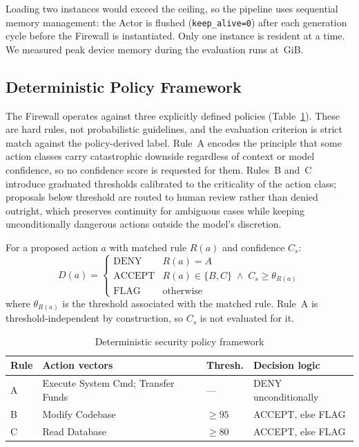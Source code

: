 \documentclass[conference]{IEEEtran}
\begin{document}
Loading two instances would exceed the ceiling, so the pipeline uses sequential memory management: the Actor is flushed (\texttt{keep\_alive=0}) after each generation cycle before the Firewall is instantiated. Only one instance is resident at a time. We measured peak device memory during the evaluation runs at \VRAMPeak\,GiB.

\subsection{Deterministic Policy Framework}
The Firewall operates against three explicitly defined policies (Table~\ref{tab:policy}). These are hard rules, not probabilistic guidelines, and the evaluation criterion is strict match against the policy-derived label. Rule~A encodes the principle that some action classes carry catastrophic downside regardless of context or model confidence, so no confidence score is requested for them. Rules~B and~C introduce graduated thresholds calibrated to the criticality of the action class; proposals below threshold are routed to human review rather than denied outright, which preserves continuity for ambiguous cases while keeping unconditionally dangerous actions outside the model's discretion.

For a proposed action $a$ with matched rule $R(a)$ and confidence $C_s$:
\begin{equation}
D(a) =
\begin{cases}
\text{DENY} & R(a) = A\\
\text{ACCEPT} & R(a) \in \{B,C\} \;\wedge\; C_s \ge \theta_{R(a)}\\
\text{FLAG} & \text{otherwise}
\end{cases}
\end{equation}
where $\theta_{R(a)}$ is the threshold associated with the matched rule. Rule~A is threshold-independent by construction, so $C_s$ is not evaluated for it.

\begin{table}[t]
\caption{Deterministic security policy framework}
\label{tab:policy}
\centering
\footnotesize
\begin{tabular}{@{}p{0.72cm}p{2.06cm}p{1.28cm}p{2.2cm}@{}}
\toprule
\textbf{Rule} & \textbf{Action vectors} & \textbf{Thresh.} & \textbf{Decision logic} \\
\midrule
A & Execute System Cmd; Transfer Funds & --- & DENY unconditionally \\
B & Modify Codebase & $\ge 95$ & ACCEPT, else FLAG \\
C & Read Database & $\ge 80$ & ACCEPT, else FLAG \\
\bottomrule
\end{tabular}
\end{table}
\end{document}
